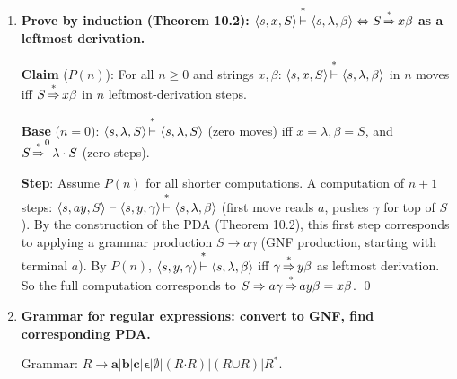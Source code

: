\begin{enumerate}[{10.}1. ]
\begin{enumerate}
\item \textbf{DPDA}: Yes. The DPDA deterministically pushes $A$s, then pops $A$s, then pushes $B$s, then pops $B$s. Each step is deterministic.

\item \textbf{Counting automaton}: No. Both $n$ and $m$ are unbounded and independently variable.

\item \textbf{Grammar from PDA} (Definition 10.7): Apply the systematic construction from the PDA in part (b) to obtain a context-free grammar. Variables are of the form $\langle q_i, X, q_j\rangle$ for states $q_i,q_j$ and stack symbol $X$.
\end{enumerate}

\item \textbf{Prove by induction (Theorem 10.2): $\langle s,x,S\rangle\Dvdash\langle s,\lambda,\beta\rangle \Leftrightarrow S\DRightarrow x\beta$ as a leftmost derivation.}

\textbf{Claim} ($P(n)$): For all $n\geq 0$ and strings $x,\beta$: $\langle s,x,S\rangle\Dvdash\langle s,\lambda,\beta\rangle$ in $n$ moves iff $S\operatorname{\overset{*}{\Rightarrow}} x\beta$ in $n$ leftmost-derivation steps.

\textbf{Base} ($n=0$): $\langle s,\lambda,S\rangle\Dvdash\langle s,\lambda,S\rangle$ (zero moves) iff $x=\lambda, \beta=S$, and $S\operatorname{\overset{*}{\Rightarrow}}^0 \lambda\cdot S$ (zero steps). \checkmark

\textbf{Step}: Assume $P(n)$ for all shorter computations. A computation of $n+1$ steps:
$\langle s,ay,S\rangle\vdash\langle s,y,\gamma\rangle\Dvdash\langle s,\lambda,\beta\rangle$ (first move reads $a$, pushes $\gamma$ for top of $S$).
By the construction of the PDA (Theorem 10.2), this first step corresponds to applying a grammar production $S \to a\gamma$ (GNF production, starting with terminal $a$). By $P(n)$, $\langle s,y,\gamma\rangle\Dvdash\langle s,\lambda,\beta\rangle$ iff $\gamma\operatorname{\overset{*}{\Rightarrow}} y\beta$ as leftmost derivation.
So the full computation corresponds to $S \Rightarrow a\gamma \operatorname{\overset{*}{\Rightarrow}} ay\beta = x\beta$. \qed

\item \textbf{Grammar for regular expressions: convert to GNF, find corresponding PDA.}

Grammar: $R \to \pmb{a}|\pmb{b}|\pmb{c}|\pmb{\epsilon}|\pmb{\emptyset}|(R\pmb{\cdot}R)|(R\pmb{\cup}R)|R^{\pmb{*}}$.


\end{enumerate}
